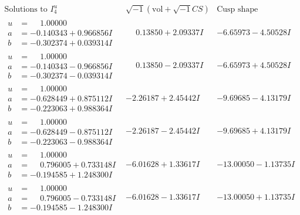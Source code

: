 \documentclass[1p]{elsarticle_modified}
\theoremstyle{definition}
\newcommand{\I}{\sqrt{-1}}
\begin{document}
$$\begin{array}{c|c|c}  
\text{Solutions to }I^u_{4}& \I (\text{vol} + \sqrt{-1}CS) & \text{Cusp shape}\\
 \hline 
\begin{aligned}
u &= \phantom{-}1.00000\phantom{ +0.000000I} \\
a &= -0.140343 + 0.966856 I \\
b &= -0.302374 + 0.039314 I\end{aligned}
 & \phantom{-}0.13850 + 2.09337 I & -6.65973 - 4.50528 I \\ \hline\begin{aligned}
u &= \phantom{-}1.00000\phantom{ +0.000000I} \\
a &= -0.140343 - 0.966856 I \\
b &= -0.302374 - 0.039314 I\end{aligned}
 & \phantom{-}0.13850 - 2.09337 I & -6.65973 + 4.50528 I \\ \hline\begin{aligned}
u &= \phantom{-}1.00000\phantom{ +0.000000I} \\
a &= -0.628449 + 0.875112 I \\
b &= -0.223063 + 0.988364 I\end{aligned}
 & -2.26187 + 2.45442 I & -9.69685 - 4.13179 I \\ \hline\begin{aligned}
u &= \phantom{-}1.00000\phantom{ +0.000000I} \\
a &= -0.628449 - 0.875112 I \\
b &= -0.223063 - 0.988364 I\end{aligned}
 & -2.26187 - 2.45442 I & -9.69685 + 4.13179 I \\ \hline\begin{aligned}
u &= \phantom{-}1.00000\phantom{ +0.000000I} \\
a &= \phantom{-}0.796005 + 0.733148 I \\
b &= -0.194585 + 1.248300 I\end{aligned}
 & -6.01628 + 1.33617 I & -13.00050 - 1.13735 I \\ \hline\begin{aligned}
u &= \phantom{-}1.00000\phantom{ +0.000000I} \\
a &= \phantom{-}0.796005 - 0.733148 I \\
b &= -0.194585 - 1.248300 I\end{aligned}
 & -6.01628 - 1.33617 I & -13.00050 + 1.13735 I \\ \hline\begin{aligned}

\end{aligned}
\end{array}$$
\end{document}
